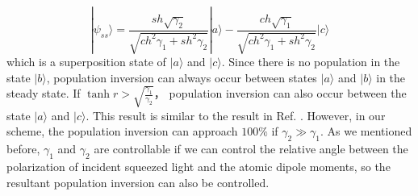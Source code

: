 \documentclass[aps,showpacs,twocolumn,twoside,groupedaddress]{revtex4}
\begin{document}
\begin{equation}
|\psi_{ss}\rangle=\frac{sh\sqrt{\gamma_{2}}}{\sqrt{ch^{2}\gamma_{1}+sh^{2}\gamma_{2}}}|a\rangle-\frac{ch\sqrt{\gamma_{1}}}{\sqrt{ch^{2}\gamma_{1}+sh^{2}\gamma_{2}}}|c\rangle
\end{equation}
which is a superposition state of $|a\rangle$ and $|c\rangle$. Since there is no population in the state $|b\rangle$,  population inversion can always occur between states $|a\rangle$ and $|b\rangle$ in the steady state. If $\tanh r>\sqrt{\frac{\gamma_{1}}{\gamma_{2}}}$， population inversion can also occur between the state $|a\rangle$ and $|c\rangle$. This  result is similar to the result in Ref. \cite{ficek1991three}. However, in our scheme, the population inversion can approach $100\%$ if $\gamma_2\gg\gamma_1$.  As we mentioned before, $\gamma_1$ and $\gamma_2$ are controllable if we can control the relative angle between the polarization of incident squeezed light and the atomic dipole moments, so the resultant population inversion can also be controlled.
\end{document}
